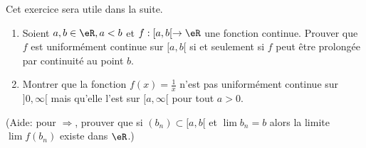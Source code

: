 
\begin{exercice}\label{exo0093}

Cet exercice sera utile dans la suite.

\begin{enumerate}
\item
Soient $a,b\in \eR, a<b$ et $f:[a,b[\to \eR$ une fonction continue. Prouver que $f$ est uniformément continue sur $[a,b[$ si et seulement si $f$ peut être prolongée par continuité au point $b$.

\item
Montrer que la fonction $f(x)= \frac{1}{x}$ n'est pas uniformément continue sur $]0, \infty[$ mais qu'elle l'est sur $[a, \infty[$ pour tout $a>0$.
\end{enumerate}
(Aide: pour $\Rightarrow$, prouver que si $(b_n)\subset [a,b[$ et $\lim b_n = b$ alors la limite $\lim f(b_n)$ existe dans $\eR$.)


\end{exercice}
